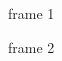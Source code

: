 \documentclass[14pt,handout,draft,t]{beamer}
\begin{document}

\begin{frame}
frame 1
\end{frame}

\begin{frame}
frame 2
\end{frame}
\end{document}
